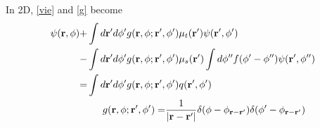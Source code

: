 \documentclass[main]{subfiles}
\begin{document}
In 2D, \eqref{vie} and \eqref{g} become
\begin{align} 
	\begin{split} 
		\label{vie2d}
		\psi(\mathbf{r},\phi) +& \int d\mathbf{r}^{\prime} d\phi^{\prime}
		g(\mathbf{r},\phi;\mathbf{r}^{\prime},\phi^{\prime})
		\mu_t(\mathbf{r}^{\prime})\psi(\mathbf{r}^{\prime},\phi^{\prime})
		\\
		-& \int d\mathbf{r}^{\prime} d\phi^{\prime} g(\mathbf{r},\phi;\mathbf{r}^{\prime},\phi^{\prime})
		\mu_s(\mathbf{r}^{\prime}) \int d\phi^{{\prime\prime}}
		f(\phi^{\prime}-\phi^{{\prime\prime}})\psi(\mathbf{r}^{\prime},\phi^{{\prime\prime}})
		\\
		=& \int d\mathbf{r}^{\prime} d\phi^{\prime}
		g(\mathbf{r},\phi;\mathbf{r}^{\prime},\phi^{\prime})q(\mathbf{r}^{\prime},\phi^{\prime})
	\end{split}
	\\
	\begin{split}
		\label{g2d}
		g(\mathbf{r},\phi;\mathbf{r}^{\prime},\phi^{\prime}) =& \frac{1}{\left| \mathbf{r}-\mathbf{r}^{\prime} \right|} 
		\delta(\phi-\phi_{\mathbf{r}-\mathbf{r}^{\prime}})
		\delta(\phi^{\prime}-\phi_{\mathbf{r}-\mathbf{r}^{\prime}}) 
	\end{split}
\end{align}
\end{document}
